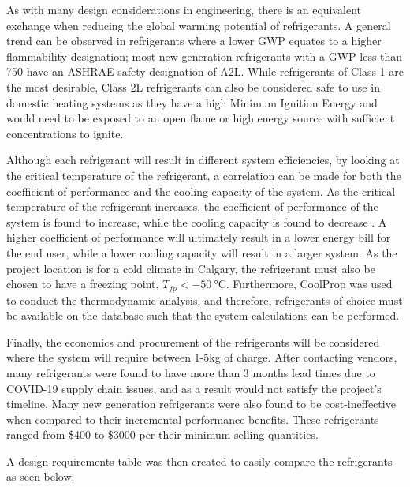 \medskip
As with many design considerations in engineering, there is an equivalent exchange when reducing the global warming potential of refrigerants. A general trend can be observed in refrigerants where a lower GWP equates to a higher flammability designation; most new generation refrigerants with a GWP less than 750 have an ASHRAE safety designation of A2L. While refrigerants of Class 1 are the most desirable, Class 2L refrigerants can also be considered safe \cite{low_gwp} to use in domestic heating systems as they have a high Minimum Ignition Energy and would need to be exposed to an open flame or high energy source with sufficient concentrations to ignite.

\medskip
Although each refrigerant will result in different system efficiencies, by looking at the critical temperature of the refrigerant, a correlation can be made for both the coefficient of performance and the cooling capacity of the system. As the critical temperature of the refrigerant increases, the coefficient of performance of the system is found to increase, while the cooling capacity is found to decrease \cite{low_gwp_options}. A higher coefficient of performance will ultimately result in a lower energy bill for the end user, while a lower cooling capacity will result in a larger system. As the project location is for a cold climate in Calgary, the refrigerant must also be chosen to have a freezing point, $T_{fp} < \SI{-50}{\celsius}$. Furthermore, CoolProp \cite{cool_prop} was used to conduct the thermodynamic analysis, and therefore, refrigerants of choice must be available on the database such that the system calculations can be performed.

\medskip
Finally, the economics and procurement of the refrigerants will be considered where the system will require between 1-5kg of charge. After contacting vendors, many refrigerants were found to have more than 3 months lead times due to COVID-19 supply chain issues, and as a result would not satisfy the project’s timeline. Many new generation refrigerants were also found to be cost-ineffective when compared to their incremental performance benefits. These refrigerants ranged from \$400 to \$3000 per their minimum selling quantities.

\medskip
A design requirements table was then created to easily compare the refrigerants as seen below.

